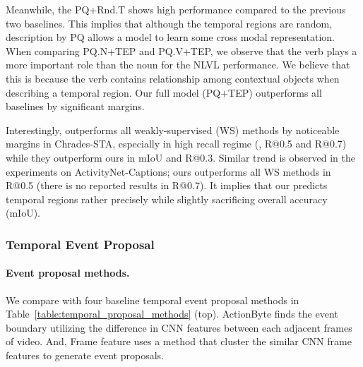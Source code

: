 Meanwhile, the {PQ+Rnd.T} shows high performance compared to the previous two baselines. 
This implies that although the temporal regions are random, description by {PQ} allows a model to learn some cross modal representation. 
When comparing {PQ.N+TEP} and {PQ.V+TEP}, we observe that the verb plays a more important role than the noun for the NLVL performance.
We believe that this is because the verb contains relationship among contextual objects when describing a temporal region.
Our full model (PQ+TEP) outperforms all baselines by significant margins. 

Interestingly, \method outperforms all weakly-supervised (WS) methods by noticeable margins in Chrades-STA, especially in high recall regime (\eg, R@0.5 and R@0.7) while they outperform ours in mIoU and R@0.3.
Similar trend is observed in the experiments on ActivityNet-Captions; ours outperforms all WS methods in R@0.5 (there is no reported results in R@0.7).
It implies that our \method predicts temporal regions rather precisely while slightly sacrificing overall accuracy (mIoU).


\vspace{-0.5em}\subsubsection{Temporal Event Proposal}
\label{sec:exp_tmp_event_proposal}

\paragraph{Event proposal methods.}
We compare \method with four baseline temporal event proposal methods in Table~\ref{table:temporal_proposal_methods} (top).
ActionByte finds the event boundary utilizing the difference in CNN features between each adjacent frames of video. 
And, Frame feature uses a method that cluster the similar CNN frame features to generate event proposals.

